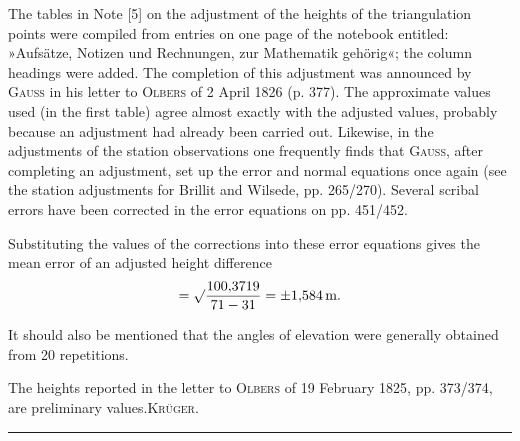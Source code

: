 \par\noindent\hspace*{\parindent}The tables in Note [5] on the adjustment of the heights of the
triangulation points were compiled from entries on one page of the notebook entitled:
»Aufsätze, Notizen und Rechnungen, zur Mathematik gehörig«;
the column headings were added. The completion of this
adjustment was announced by \textsc{Gauss} in his letter to \textsc{Olbers} of
2 April 1826 (p. 377). The approximate values used (in the first table)
agree almost exactly with the adjusted values, probably because
an adjustment had already been carried out. Likewise, in the adjustments of the
station observations one frequently finds that \textsc{Gauss}, after completing an
adjustment, set up the error and normal equations once again
(see the station adjustments for Brillit and Wilsede, pp. 265/270).
Several scribal errors have been corrected in the error equations on pp. 451/452.
\par\noindent\hspace*{\parindent}Substituting the values of the corrections into these error equations
gives the mean error of an adjusted height difference
\[
=\surd\frac{100{,}3719}{71-31}=\pm1{,}584\,\text{m}.
\]
\par\noindent\hspace*{\parindent}It should also be mentioned that the angles of elevation were generally obtained from
20 repetitions.
\par\noindent\hspace*{\parindent}The heights reported in the letter to \textsc{Olbers} of 19 February 1825, pp. 373/374,
are preliminary values.\hfill\textsc{Krüger.}\par
\endgroup
\par\medskip
\begin{center}\rule{.24\linewidth}{.4pt}\end{center}

